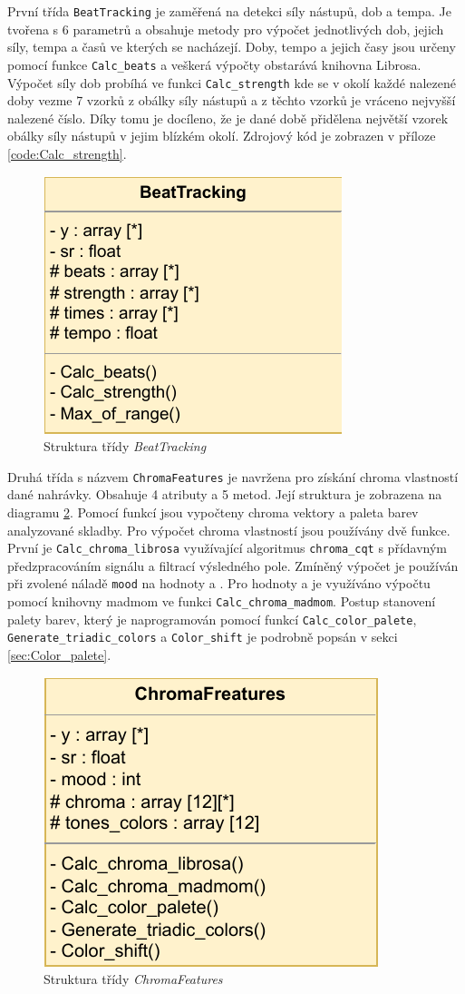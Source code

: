 První třída \texttt{BeatTracking} je zaměřená na detekci síly nástupů, dob a tempa. Je tvořena s 6 parametrů a obsahuje metody pro výpočet jednotlivých dob, jejich síly, tempa a časů ve kterých se nacházejí. Doby, tempo a jejich časy jsou určeny pomocí funkce \texttt{Calc\_beats} a veškerá výpočty obstarává knihovna Librosa. Výpočet síly dob probíhá ve funkci \texttt{Calc\_strength} kde se v okolí každé nalezené doby vezme 7 vzorků z obálky síly nástupů a z těchto vzorků je vráceno nejvyšší nalezené číslo. Díky tomu je docíleno, že je dané době přidělena největší vzorek obálky síly nástupů v jejim blízkém okolí. Zdrojový kód je zobrazen v příloze \ref{code:Calc_strength}.

\begin{figure}[H]
    \centering
        \includegraphics[width = 0.3\linewidth]{obrazky/UML_diagramy_BeatTracking.pdf}
        \caption{Struktura třídy \textit{BeatTracking}}
        \label{fig:BeatTracking_class_diagram}
\end{figure}

Druhá třída s názvem \texttt{ChromaFeatures} je navržena pro získání chroma vlastností dané nahrávky. Obsahuje 4 atributy a 5 metod. Její struktura je zobrazena na diagramu \ref{fig:ChromaFeatures_class_diagram}. Pomocí funkcí jsou vypočteny chroma vektory a paleta barev analyzované skladby. Pro výpočet chroma vlastností jsou používány dvě funkce. První je \texttt{Calc\_chroma\_librosa} využívající algoritmus \texttt{chroma\_cqt} s přídavným předzpracováním signálu a filtrací výsledného pole. Zmíněný výpočet je používán při zvolené náladě \texttt{mood} na hodnoty  a . Pro hodnoty  a  je využíváno výpočtu pomocí knihovny madmom ve funkci \texttt{Calc\_chroma\_madmom}. Postup stanovení palety barev, který je naprogramován pomocí funkcí \texttt{Calc\_color\_palete}, \texttt{Generate\_triadic\_colors} a \texttt{Color\_shift} je podrobně popsán v sekci \ref{sec:Color_palete}.

\begin{figure}[H]
    \centering
        \includegraphics[width = 0.3\linewidth]{obrazky/UML_diagram_ChromaFeatures.pdf}
        \caption{Struktura třídy \textit{ChromaFeatures}}
        \label{fig:ChromaFeatures_class_diagram}
\end{figure}


